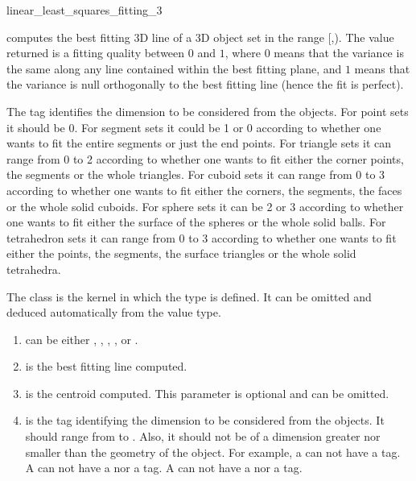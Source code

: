 \begin{ccRefFunction}{linear_least_squares_fitting_3}

{ computes the best fitting 3D line of a 3D object set in the range
[,). The value returned is a fitting quality
between $0$ and $1$, where $0$ means that the variance is the same
along any line contained within the best fitting plane, and $1$ means that the variance is null orthogonally to the best fitting line (hence the fit is perfect). }

The tag  identifies the dimension to be considered from the objects. For point sets it should be 0. For segment sets it could be 1 or 0 according to whether one wants to fit the entire segments or just the end points. For triangle sets it can range from 0 to 2 according to whether one wants to fit either the corner points, the segments or the whole triangles. For cuboid sets it can range from 0 to 3 according to whether one wants to fit either the corners, the segments, the faces or the whole solid cuboids. For sphere sets it can be 2 or 3 according to whether one wants to fit either the surface of the spheres or the whole solid balls. For tetrahedron sets it can range from 0 to 3 according to whether one wants to fit either the points, the segments, the surface triangles or the whole solid tetrahedra.

The class  is the kernel in which the type  is defined. It can be omitted and deduced automatically from the value type.


\begin{enumerate}
   \item  {} can be either , 
          , , ,
           or .
   \item  {} is the best fitting line computed.
   \item  {} is the centroid computed. This parameter is optional and can be omitted.
   \item  {} is the tag identifying the dimension to be considered from the objects. It should range from  to . Also, it should not be of a dimension greater nor smaller than the geometry of the object. For example, a  can not have a  tag. A  can not have a  nor a  tag. A  can not have a  nor a  tag.
\end{enumerate}



\end{ccRefFunction}
